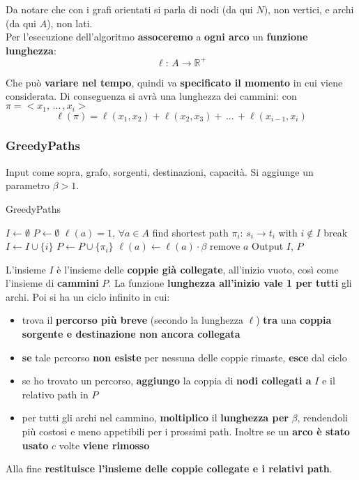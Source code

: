 Da notare che con i grafi orientati si parla di nodi (da qui $N$), non vertici, e archi (da qui $A$), non lati.\\

Per l'esecuzione dell'algoritmo \textbf{assoceremo} a \textbf{ogni arco} un \textbf{funzione lunghezza}:
$$ \ell: \, A \rightarrow \mathbb{R}^+ $$

Che può \textbf{variare nel tempo}, quindi va \textbf{specificato il momento} in cui viene considerata. Di conseguenza si avrà una lunghezza dei cammini: con $\pi = <x_1, \, ... \, , x_i>$
$$ \ell (\pi) = \ell (x_1, x_2) + \ell (x_2, x_3) + \, ...  \, + \ell (x_{i-1}, x_i) $$

\newpage

\subsubsection{GreedyPaths}
Input come sopra, grafo, sorgenti, destinazioni, capacità. Si aggiunge un parametro $\beta>1$.

\begin{algorithm}
	\caption{GreedyPaths}
	\begin{algorithmic}
		\STATE $I \leftarrow \emptyset$
		\STATE $P \leftarrow \emptyset$
		\STATE $\ell(a) = 1 $, $\forall a \in A$
		\STATE find shortest path $\pi_i: \, s_i \rightarrow t_i$ with $i \notin I$
		\STATE break
		\ENDIF
		\STATE $I \leftarrow I \cup \{i\}$
		\STATE $P \leftarrow P \cup \{\pi_i\}$
		\STATE $\ell (a) \leftarrow \ell (a) \cdot \beta$
		\STATE remove $a$
		\ENDIF
		\ENDFOR
		\ENDWHILE
		\STATE Output $I$, $P$
	\end{algorithmic}
\end{algorithm}

L'insieme $I$ è l'insieme delle \textbf{coppie già collegate}, all'inizio vuoto, così come l'insieme di \textbf{cammini} $P$. La funzione \textbf{lunghezza all'inizio vale 1 per tutti} gli archi. Poi si ha un ciclo infinito in cui: 
\begin{itemize}
	\item trova il \textbf{percorso più breve} (secondo la lunghezza $\ell$) \textbf{tra} una \textbf{coppia sorgente e destinazione non ancora collegata}
	\item \textbf{se} tale percorso \textbf{non esiste} per nessuna delle coppie rimaste, \textbf{esce} dal ciclo
	\item se ho trovato un percorso, \textbf{aggiungo} la coppia di \textbf{nodi collegati a} $I$ e il relativo path in $P$
	\item per tutti gli archi nel cammino, \textbf{moltiplico} il \textbf{lunghezza per} $\beta$, rendendoli più costosi e meno appetibili per i prossimi path. Inoltre se un \textbf{arco è stato usato} $c$ volte \textbf{viene rimosso}
\end{itemize}
Alla fine \textbf{restituisce l'insieme delle coppie collegate e i relativi path}.\\

